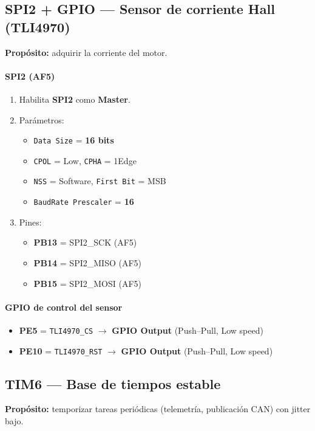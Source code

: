 \documentclass[a4paper,12pt]{article}
\begin{document}
\subsection{SPI2 + GPIO — Sensor de corriente Hall (TLI4970)}
\textbf{Propósito:} adquirir la corriente del motor.

\paragraph{SPI2 (AF5)}
\begin{enumerate}
  \item Habilita \textbf{SPI2} como \textbf{Master}.
  \item Parámetros:
  \begin{itemize}
    \item \texttt{Data Size} = \textbf{16 bits}
    \item \texttt{CPOL} = Low, \texttt{CPHA} = 1Edge
    \item \texttt{NSS} = Software, \texttt{First Bit} = MSB
    \item \texttt{BaudRate Prescaler} = \textbf{16}
  \end{itemize}
  \item Pines:
  \begin{itemize}
    \item \textbf{PB13} = SPI2\_SCK (AF5)
    \item \textbf{PB14} = SPI2\_MISO (AF5)
    \item \textbf{PB15} = SPI2\_MOSI (AF5)
  \end{itemize}
\end{enumerate}

\paragraph{GPIO de control del sensor}
\begin{itemize}
  \item \textbf{PE5} = \texttt{TLI4970\_CS} $\rightarrow$ \textbf{GPIO Output} (Push--Pull, Low speed)
  \item \textbf{PE10} = \texttt{TLI4970\_RST} $\rightarrow$ \textbf{GPIO Output} (Push--Pull, Low speed)
\end{itemize}



\subsection{TIM6  — Base de tiempos estable}
\textbf{Propósito:} temporizar tareas periódicas (telemetría, publicación CAN) con jitter bajo.
\end{document}
